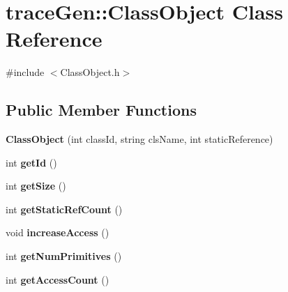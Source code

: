 \hypertarget{classtrace_gen_1_1_class_object}{}\section{trace\+Gen\+:\+:Class\+Object Class Reference}
\label{classtrace_gen_1_1_class_object}


{\ttfamily \#include $<$Class\+Object.\+h$>$}

\subsection*{Public Member Functions}
\begin{DoxyCompactItemize}
\item 
\hypertarget{classtrace_gen_1_1_class_object_a22c6df990a2dc0a327101718e38cc53e}{}{\bfseries Class\+Object} (int class\+Id, string cls\+Name, int static\+Reference)\label{classtrace_gen_1_1_class_object_a22c6df990a2dc0a327101718e38cc53e}

\item 
\hypertarget{classtrace_gen_1_1_class_object_a643aa951059afe4858b7653e13a4704a}{}int {\bfseries get\+Id} ()\label{classtrace_gen_1_1_class_object_a643aa951059afe4858b7653e13a4704a}

\item 
\hypertarget{classtrace_gen_1_1_class_object_a104b2641d15fe8d18d80d7ce472e032c}{}int {\bfseries get\+Size} ()\label{classtrace_gen_1_1_class_object_a104b2641d15fe8d18d80d7ce472e032c}

\item 
\hypertarget{classtrace_gen_1_1_class_object_a0077027c259085a66ca6e191b7c4e71f}{}int {\bfseries get\+Static\+Ref\+Count} ()\label{classtrace_gen_1_1_class_object_a0077027c259085a66ca6e191b7c4e71f}

\item 
\hypertarget{classtrace_gen_1_1_class_object_a50555b3d5947c615ebf44a61ea6074a5}{}void {\bfseries increase\+Access} ()\label{classtrace_gen_1_1_class_object_a50555b3d5947c615ebf44a61ea6074a5}

\item 
\hypertarget{classtrace_gen_1_1_class_object_adc930ba11f7acadc1a7fcec456b1079f}{}int {\bfseries get\+Num\+Primitives} ()\label{classtrace_gen_1_1_class_object_adc930ba11f7acadc1a7fcec456b1079f}

\item 
\hypertarget{classtrace_gen_1_1_class_object_aa5e045d9c92ca95b194790a7bad6e8e6}{}int {\bfseries get\+Access\+Count} ()\label{classtrace_gen_1_1_class_object_aa5e045d9c92ca95b194790a7bad6e8e6}


\end{DoxyCompactItemize}
